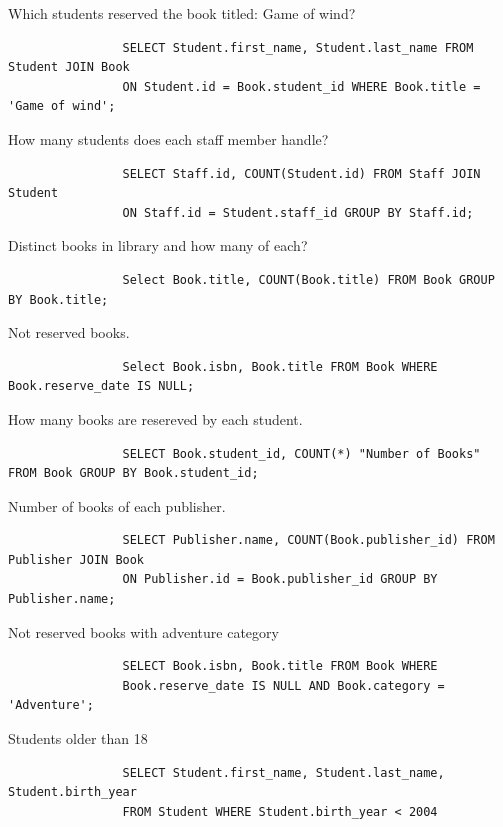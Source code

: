 \documentclass[11pt]{article}
\begin{document}
			Which students reserved the book titled: Game of wind?
			\begin{verbatim}
				SELECT Student.first_name, Student.last_name FROM Student JOIN Book
				ON Student.id = Book.student_id WHERE Book.title = 'Game of wind';
			\end{verbatim}
			
			How many students does each staff member handle?
			\begin{verbatim}
				SELECT Staff.id, COUNT(Student.id) FROM Staff JOIN Student
				ON Staff.id = Student.staff_id GROUP BY Staff.id;
			\end{verbatim}
				
			Distinct books in library and how many of each?
			\begin{verbatim}
				Select Book.title, COUNT(Book.title) FROM Book GROUP BY Book.title;
			\end{verbatim}
			
			Not reserved books.
			\begin{verbatim}
				Select Book.isbn, Book.title FROM Book WHERE Book.reserve_date IS NULL;
			\end{verbatim}
			
			
			\newpage
			How many books are resereved by each student.
			\begin{verbatim}
				SELECT Book.student_id, COUNT(*) "Number of Books" FROM Book GROUP BY Book.student_id;
			\end{verbatim}
			
			Number of books of each publisher.
			\begin{verbatim}
				SELECT Publisher.name, COUNT(Book.publisher_id) FROM Publisher JOIN Book
				ON Publisher.id = Book.publisher_id GROUP BY Publisher.name;
			\end{verbatim}
			
			Not reserved books with adventure category
			\begin{verbatim}
				SELECT Book.isbn, Book.title FROM Book WHERE
				Book.reserve_date IS NULL AND Book.category = 'Adventure';
			\end{verbatim}
			
			Students older than 18
			\begin{verbatim}
				SELECT Student.first_name, Student.last_name, Student.birth_year
				FROM Student WHERE Student.birth_year < 2004
			\end{verbatim}
\end{document}
